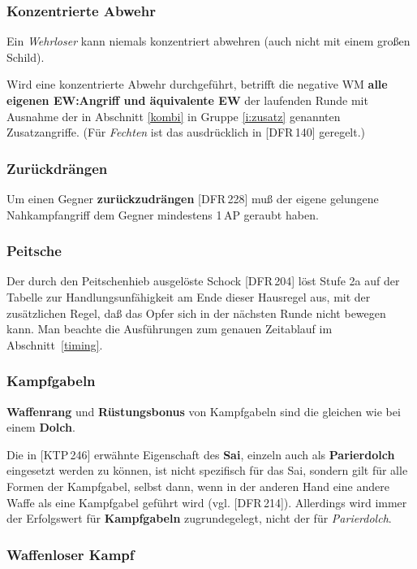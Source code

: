 \documentclass[10pt,a4paper,germanpar]{article}
\begin{document}
\subsubsection{Konzentrierte Abwehr}

Ein \emph{Wehrloser} kann niemals konzentriert abwehren (auch nicht
mit einem großen Schild).

Wird eine konzentrierte Abwehr durchgeführt, betrifft die negative WM
\textbf{alle eigenen EW:Angriff und äquivalente EW} der laufenden
Runde mit Ausnahme der in Abschnitt \ref{kombi} in Gruppe
\ref{i:zusatz} genannten Zusatzangriffe. (Für \emph{Fechten} ist
das ausdrücklich in [DFR\,140] geregelt.)

\subsubsection{Zurückdrängen}

Um einen Gegner \textbf{zurückzudrängen} [DFR\,228] muß der eigene
gelungene Nahkampfangriff dem Gegner mindestens 1\,AP geraubt haben.

\subsubsection{Peitsche}

Der durch den Peitschenhieb ausgelöste Schock [DFR\,204] löst Stufe 2a
auf der Tabelle zur Handlungsunfähigkeit am Ende dieser Hausregel aus,
mit der zusätzlichen Regel, daß das Opfer sich in der nächsten Runde
nicht bewegen kann. Man beachte die Ausführungen zum genauen
Zeitablauf im Abschnitt~\ref{timing}.

\subsubsection{Kampfgabeln}

\textbf{Waffenrang} und \textbf{Rüstungsbonus} von Kampfgabeln sind
die gleichen wie bei einem \textbf{Dolch}.

Die in [KTP\,246] erwähnte Eigenschaft des \textbf{Sai}, einzeln auch
als \textbf{Parierdolch} eingesetzt werden zu können, ist nicht
spezifisch für das Sai, sondern gilt für alle Formen der Kampfgabel,
selbst dann, wenn in der anderen Hand eine andere Waffe als eine
Kampfgabel geführt wird (vgl. [DFR\,214]). Allerdings wird immer der
Erfolgswert für \textbf{Kampfgabeln} zugrundegelegt, nicht der für
\emph{Parierdolch}.

\subsubsection{Waffenloser Kampf}
\label{wlk}
\end{document}

